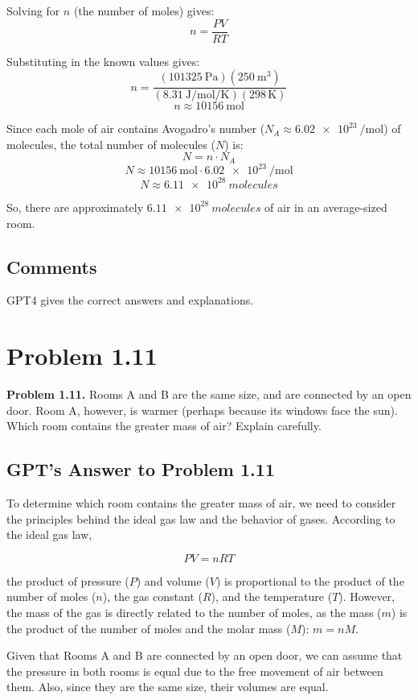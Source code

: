 \documentclass[12pt]{article}
\begin{document}
Solving for \(n\) (the number of moles) gives:
\[
n = \frac{PV}{RT}
\]

Substituting in the known values gives:
\[
n = \frac{(\SI{101325}{\pascal})(\SI{250}{\meter\cubed})}{(\SI{8.31}{\joule\per\mole\per\kelvin})(298 \, \text{K})}
\]
\[
n \approx \SI{10156}{\mole}
\]

Since each mole of air contains Avogadro's number (\(N_A \approx \SI{6.02e23}{\per\mole}\)) of molecules, the total number of molecules (\(N\)) is:
\[
N = n \cdot N_A
\]
\[
N \approx \SI{10156}{\mole} \cdot \SI{6.02e23}{\per\mole}
\]
\[
N \approx \SI{6.11e28}{molecules}
\]

So, there are approximately \(\SI{6.11e28}{molecules}\) of air in an average-sized room.

\subsection*{Comments}

GPT4 gives the correct answers and explanations.

\section*{Problem 1.11}

\textbf{Problem 1.11.} Rooms A and B are the same size, and are connected by an open door. Room A, however, is warmer (perhaps because its windows face the sun). Which room contains the greater mass of air? Explain carefully.

\subsection*{GPT's Answer to Problem 1.11}

To determine which room contains the greater mass of air, we need to consider the principles behind the ideal gas law and the behavior of gases. According to the ideal gas law, 

\[
PV = nRT
\]

the product of pressure (\(P\)) and volume (\(V\)) is proportional to the product of the number of moles (\(n\)), the gas constant (\(R\)), and the temperature (\(T\)). However, the mass of the gas is directly related to the number of moles, as the mass (\(m\)) is the product of the number of moles and the molar mass (\(M\)): \(m = nM\).

Given that Rooms A and B are connected by an open door, we can assume that the pressure in both rooms is equal due to the free movement of air between them. Also, since they are the same size, their volumes are equal. 
\end{document}

